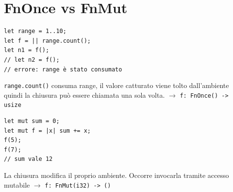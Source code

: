 

\section{FnOnce vs FnMut}

\begin{center}
  \begin{minipage}{0.45\linewidth}
    \begin{verbatim}
let range = 1..10;
let f = || range.count();
let n1 = f();
// let n2 = f();
// errore: range è stato consumato
\end{verbatim}

    \verb|range.count()| consuma range, il valore catturato viene tolto dall'ambiente quindi
    la chiusura può essere chiamata una sola volta. $\to$ \verb|f: FnOnce() -> usize|
  \end{minipage}%
  \hfill
  \begin{minipage}{0.45\linewidth}
    \begin{verbatim}
let mut sum = 0;
let mut f = |x| sum += x;
f(5);
f(7);
// sum vale 12
\end{verbatim}

    La chiusura modifica il proprio ambiente. Occorre invocarla tramite accesso mutabile
    $\to$ \verb|f: FnMut(i32) -> ()|
  \end{minipage}
\end{center}


